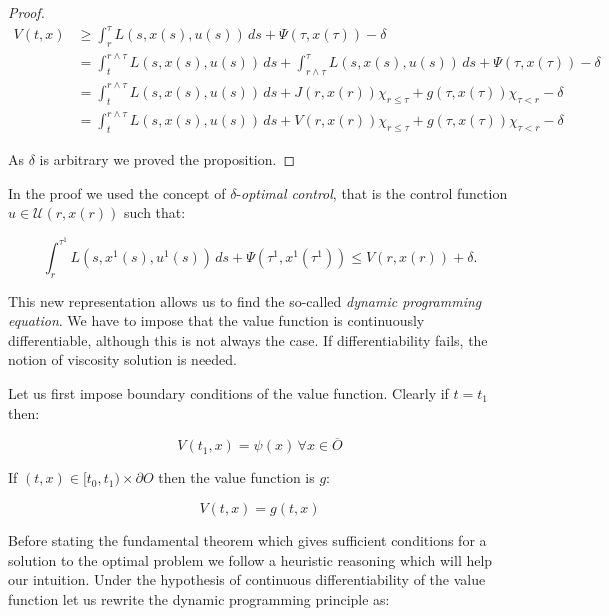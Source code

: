 \begin{proposition}
\begin{proof}
    \begin{align*}
        V(t,x) & \geq \int_r^{\tau}L(s,x(s),u(s))\,ds+\Psi(\tau,x(\tau)) - \delta \\
        & = \int_t^{r\land\tau} L(s,x(s),u(s))\,ds+\int_{r\land\tau}^{\tau} L(s,x(s),u(s))\,ds+\Psi(\tau,x(\tau)) -\delta\\
        & = \int_t^{r\land\tau} L(s,x(s),u(s))\,ds+J(r,x(r))\chi_{r\leq\tau}+g(\tau,x(\tau))\chi_{\tau<r} - \delta\\
        & = \int_t^{r\land\tau} L(s,x(s),u(s))\,ds+V(r,x(r))\chi_{r\leq\tau}+g(\tau,x(\tau))\chi_{\tau<r} - \delta
    \end{align*}

    As $\delta$ is arbitrary we proved the proposition.
    \end{proof}
\end{proposition}


In the proof we used the concept of $\delta$-\textit{optimal control}, that is the control function $u\in\mathcal{U}(r,x(r))$ such that:

\[\int_r^{\tau^1}L(s,x^1(s),u^1(s))\,ds+\Psi(\tau^1,x^1(\tau^1))\leq V(r,x(r))+\delta.\]

This new representation allows us to find the so-called \textit{dynamic programming equation}. We have to impose that the value function 
is continuously differentiable, although this is not always the case. If differentiability fails, the notion of viscosity solution is needed. 

Let us first impose boundary conditions of the value function. Clearly if $t=t_1$ then:

\begin{equation}\label{1-2-boundcond1}
    V(t_1,x)=\psi(x)\,\forall x\in \overline{O}
\end{equation}

If $(t,x)\in [t_0,t_1)\times\partial O$ then the value function is $g$:

\begin{equation}\label{1-2-boundcond2}
    V(t, x) = g(t,x)
\end{equation}

Before stating the fundamental theorem which gives sufficient conditions 
for a solution to the optimal problem we follow a heuristic reasoning which will help our intuition. Under the hypothesis of continuous differentiability of the value function 
let us rewrite the dynamic programming principle as:

